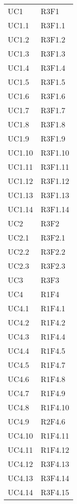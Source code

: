 \begin{longtable} {
		>{\centering}p{28mm}  
		>{}p{20mm}
		}
		UC1 & R3F1 \TBstrut \\ [2mm]
		UC1.1 & R3F1.1 \TBstrut \\ [2mm]
		UC1.2 & R3F1.2 \TBstrut \\ [2mm]
		UC1.3 & R3F1.3 \TBstrut \\ [2mm]
		UC1.4 & R3F1.4 \TBstrut \\ [2mm]
		UC1.5 & R3F1.5 \TBstrut \\ [2mm]
		UC1.6 & R3F1.6 \TBstrut \\ [2mm]
		UC1.7 & R3F1.7 \TBstrut \\ [2mm]
		UC1.8 & R3F1.8 \TBstrut \\ [2mm]
		UC1.9 & R3F1.9 \TBstrut \\ [2mm]
		UC1.10 & R3F1.10 \TBstrut \\ [2mm]
		UC1.11 & R3F1.11 \TBstrut \\ [2mm]
		UC1.12 & R3F1.12 \TBstrut \\ [2mm]
		UC1.13 & R3F1.13 \TBstrut \\ [2mm]
		UC1.14 & R3F1.14 \TBstrut \\ [2mm]
		UC2 & R3F2 \TBstrut \\ [2mm]
		UC2.1 & R3F2.1 \TBstrut \\ [2mm]
		UC2.2 & R3F2.2 \TBstrut \\ [2mm]
		UC2.3 & R3F2.3 \TBstrut \\ [2mm]
		UC3 & R3F3 \TBstrut \\ [2mm]
		UC4 & R1F4 \TBstrut \\ [2mm]
		UC4.1 & R1F4.1 \TBstrut \\ [2mm]
		UC4.2 & R1F4.2 \TBstrut \\ [2mm]
		UC4.3 & R1F4.4 \TBstrut \\ [2mm]
		UC4.4 & R1F4.5 \TBstrut \\ [2mm]
		UC4.5 & R1F4.7 \TBstrut \\ [2mm]
		UC4.6 & R1F4.8 \TBstrut \\ [2mm]
		UC4.7 & R1F4.9 \TBstrut \\ [2mm]
		UC4.8 & R1F4.10 \TBstrut \\ [2mm]
		UC4.9 & R2F4.6 \TBstrut \\ [2mm]
		UC4.10 & R1F4.11 \TBstrut \\ [2mm]
		UC4.11 & R1F4.12 \TBstrut \\ [2mm]
		UC4.12 & R3F4.13 \TBstrut \\ [2mm]
		UC4.13 & R3F4.14 \TBstrut \\ [2mm]
		UC4.14 & R3F4.15 \TBstrut \\ [2mm]

\end{longtable}
